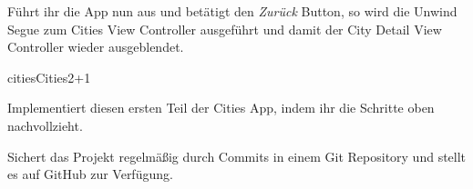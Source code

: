 \documentclass[parskip=half, final]{scrreprt}
\begin{document}
\begin{lecture}
\begin{enumerate}

Führt ihr die App nun aus und betätigt den \emph{Zurück} Button, so wird die Unwind Segue zum Cities View Controller ausgeführt und damit der City Detail View Controller wieder ausgeblendet.

\end{enumerate}

\begin{exc}
\begin{excitem}{cities}{Cities}{2+1}

Implementiert diesen ersten Teil der Cities App, indem ihr die Schritte oben nachvollzieht.

 Sichert das Projekt regelmäßig durch Commits in einem Git Repository und stellt es auf GitHub zur Verfügung.

\end{excitem}
\end{exc}


\end{lecture}
\end{document}
